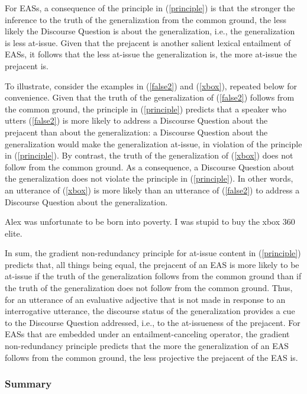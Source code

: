 \documentclass[11pt,fleqn]{article}
\newcommand{\6}{\mbox{$[\hspace*{-.6mm}[$}}
\newcommand{\9}{\mbox{$]\hspace*{-.6mm}]$}}
\begin{document}
For EASs, a consequence of the principle in (\ref{principle}) is that the stronger the inference to the truth of the generalization from the common ground, the less likely the Discourse Question is about the generalization, i.e., the generalization is less at-issue. Given that the prejacent is another salient lexical entailment of EASs, it follows that the less at-issue the generalization is, the more at-issue the prejacent is.

To illustrate, consider the examples in (\ref{false2}) and (\ref{xbox}), repeated below for convenience. Given that the truth of the generalization of (\ref{false2}) follows from the common ground, the principle in (\ref{principle}) predicts that a speaker who utters (\ref{false2}) is more likely to address a Discourse Question about the prejacent than about the generalization: a Discourse Question about the generalization would make the generalization at-issue, in violation of the principle in (\ref{principle}). By contrast, the truth of the generalization of (\ref{xbox}) does not follow from the common ground. As a consequence, a Discourse Question about the generalization does not violate the principle in (\ref{principle}). In other words, an utterance of (\ref{xbox}) is more likely than an utterance of (\ref{false2}) to address a Discourse Question about the generalization.

\begin{exe}
\ex\label{false2} Alex was unfortunate to be born into poverty.
\exi{(\ref{xbox})} I was stupid to buy the xbox 360 elite.
\end{exe}

In sum, the gradient non-redundancy principle for at-issue content in (\ref{principle}) predicts that, all things being equal, the prejacent of an EAS is more likely to be at-issue if the truth of the generalization follows from the common ground than if the truth of the generalization does not follow from the common ground. Thus, for an utterance of an evaluative adjective that is not made in response to an interrogative utterance, the discourse status of the generalization provides a cue to the Discourse Question addressed, i.e., to the at-issueness of the prejacent. For EASs that are embedded under an entailment-canceling operator, the gradient non-redundancy principle predicts that the more the generalization of an EAS follows from the common ground, the less projective the prejacent of the EAS is.

\subsubsection{Summary}
\end{document}
